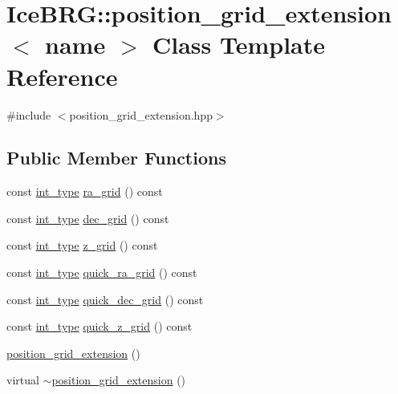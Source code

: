\hypertarget{classIceBRG_1_1position__grid__extension}{}\section{Ice\+B\+R\+G\+:\+:position\+\_\+grid\+\_\+extension$<$ name $>$ Class Template Reference}
\label{classIceBRG_1_1position__grid__extension}


{\ttfamily \#include $<$position\+\_\+grid\+\_\+extension.\+hpp$>$}

\subsection*{Public Member Functions}
\begin{DoxyCompactItemize}
\item 
const \hyperlink{lib_2IceBRG__main_2common_8h_ac4de9d9335536ac22821171deec8d39e}{int\+\_\+type} \hyperlink{classIceBRG_1_1position__grid__extension_ac35e512924be07ac117e6e1ed3c2048a}{ra\+\_\+grid} () const 
\item 
const \hyperlink{lib_2IceBRG__main_2common_8h_ac4de9d9335536ac22821171deec8d39e}{int\+\_\+type} \hyperlink{classIceBRG_1_1position__grid__extension_aa4c2e0a9db54e50c3e3ccc8f81eb3f60}{dec\+\_\+grid} () const 
\item 
const \hyperlink{lib_2IceBRG__main_2common_8h_ac4de9d9335536ac22821171deec8d39e}{int\+\_\+type} \hyperlink{classIceBRG_1_1position__grid__extension_a8e7f5c11b3c0dee2050ce2f633f45d31}{z\+\_\+grid} () const 
\item 
const \hyperlink{lib_2IceBRG__main_2common_8h_ac4de9d9335536ac22821171deec8d39e}{int\+\_\+type} \hyperlink{classIceBRG_1_1position__grid__extension_aadc38967e6f232bec1c506058026674e}{quick\+\_\+ra\+\_\+grid} () const 
\item 
const \hyperlink{lib_2IceBRG__main_2common_8h_ac4de9d9335536ac22821171deec8d39e}{int\+\_\+type} \hyperlink{classIceBRG_1_1position__grid__extension_a259258e1d4ab96213ae7f9d340bedade}{quick\+\_\+dec\+\_\+grid} () const 
\item 
const \hyperlink{lib_2IceBRG__main_2common_8h_ac4de9d9335536ac22821171deec8d39e}{int\+\_\+type} \hyperlink{classIceBRG_1_1position__grid__extension_a62b09e46f25866c6778099c72a361167}{quick\+\_\+z\+\_\+grid} () const 
\item 
\hyperlink{classIceBRG_1_1position__grid__extension_a0b89f816a6c4f515831d5485d405497b}{position\+\_\+grid\+\_\+extension} ()
\item 
virtual \hyperlink{classIceBRG_1_1position__grid__extension_adb966b63b6c22b7f2b2b7c468e305055}{$\sim$position\+\_\+grid\+\_\+extension} ()
\end{DoxyCompactItemize}


